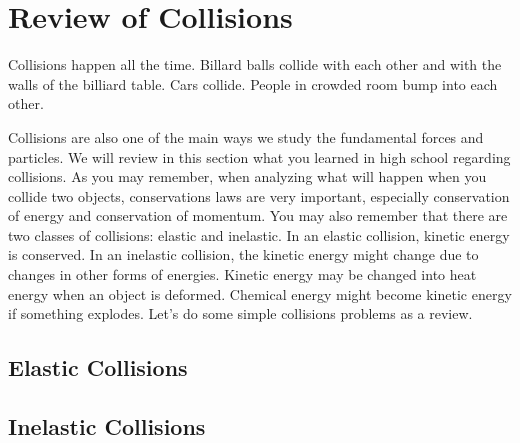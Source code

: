 \section{Review of Collisions}

Collisions happen all the time.  Billard balls collide with each other and with the walls of the billiard table.  Cars collide.  People in crowded room bump into each other.

Collisions are also one of the main ways we study the fundamental forces and particles.  We will review in this section what you learned in high school regarding collisions.  As you may remember, when analyzing what will happen when you collide two objects, conservations laws are very important, especially conservation of energy and conservation of momentum.  You may also remember that there are two classes of collisions: elastic and inelastic.  In an elastic collision, kinetic energy is conserved.  In an inelastic collision, the kinetic energy might change due to changes in other forms of energies.  Kinetic energy may be changed into heat energy when an object is deformed.  Chemical energy might become kinetic energy if something explodes.  Let's do some simple collisions problems as a review.

\subsection{Elastic Collisions}

\subsection{Inelastic Collisions}
